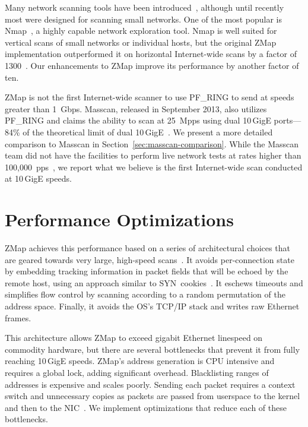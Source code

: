 Many network scanning tools have been
introduced~\cite{scanrand,unicornscan,masscan-10g,nmap,zmap-2013}, although until
recently most were designed for scanning small networks. One of the most
popular is Nmap~\cite{nmap}, a highly capable network exploration tool. Nmap
is well suited for vertical scans of small networks or individual hosts, but
the original ZMap implementation outperformed it on horizontal Internet-wide
scans by a factor of 1300~\cite{zmap-2013}. Our enhancements to ZMap improve its
performance by another factor of ten.

ZMap is not the first Internet-wide scanner to use PF\_RING to send at speeds
greater than 1~Gbps. Masscan, released in September 2013, also utilizes
PF\_RING and claims the ability to scan at 25~Mpps using dual 10\,GigE
ports---84\% of the theoretical limit of dual 10\,GigE~\cite{masscan-10g}. We
present a more detailed comparison to Masscan in
Section~\ref{sec:masscan-comparison}. While the Masscan team did not have the
facilities to perform live network tests at rates higher than
100,000~pps~\cite{masscan-10g}, we report what we believe is the first
Internet-wide scan conducted at 10\,GigE speeds.

\section{Performance Optimizations}
\label{sec:optimizations}

ZMap achieves this performance based on a series of architectural choices
that are geared towards very large, high-speed scans~\cite{zmap-2013}. It avoids
per-connection state by embedding tracking information in packet fields that
will be echoed by the remote host, using an approach similar to
SYN~cookies~\cite{bernstein1996syn}. It eschews timeouts and simplifies flow
control by scanning according to a random permutation of the address space.
Finally, it avoids the OS's TCP/IP stack and writes raw Ethernet frames.

This architecture allows ZMap to exceed gigabit Ethernet linespeed on
commodity hardware, but there are several bottlenecks that prevent it from
fully reaching 10\,GigE speeds. ZMap's address generation is CPU intensive
and requires a global lock, adding significant overhead. Blacklisting ranges
of addresses is expensive and scales poorly. Sending each packet requires a
context switch and unnecessary copies as packets are passed from userspace to
the kernel and then to the NIC~\cite{multi-core-network-2010}. We implement
optimizations that reduce each of these bottlenecks.

